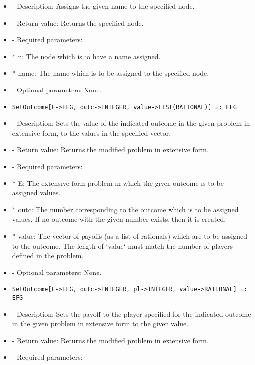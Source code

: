 \begin{itemize}
\bd
\item
- Description:  Assigns the given name to the specified node.
\item
- Return value:  Returns the specified node.
\item
- Required parameters:
	
\bd
\item
*  n:  The node which is to have a name assigned.
\item
*  name:  The name which is to be assigned to the specified node.
\ed

\item
- Optional parameters:  None.
\ed

\item
\begin{verbatim}
SetOutcome[E->EFG, outc->INTEGER, value->LIST(RATIONAL)] =: EFG
\end{verbatim}
   
\bd
\item
- Description:  Sets the value of the indicated outcome in the given 
problem in extensive form, to the values in the specified vector.
\item
- Return value:  Returns the modified problem in extensive form. 
\item
- Required parameters:
	
\bd
\item
*  E:  The extensive form problem in which the given outcome is to be
assigned values.
\item

*  outc:  The number corresponding to the outcome which is to be 
assigned values.  If no outcome with the given number exists,
then it is created.
\item
*  value:  The vector of payoffs (as a list of rationals) which are 
to be assigned to the outcome.  The length of `value` must 
match the number of players defined in the problem.
\ed

\item
- Optional parameters:  None.
\ed

\item

\begin{verbatim} 
SetOutcome[E->EFG, outc->INTEGER, pl->INTEGER, value->RATIONAL] =: EFG
\end{verbatim}

\bd
\item
- Description:  Sets the payoff to the player specified for the indicated
outcome in the given problem in extensive form to the given value.
\item
- Return value:  Returns the modified problem in extensive form.
\item
- Required parameters:
	

\end{itemize}
